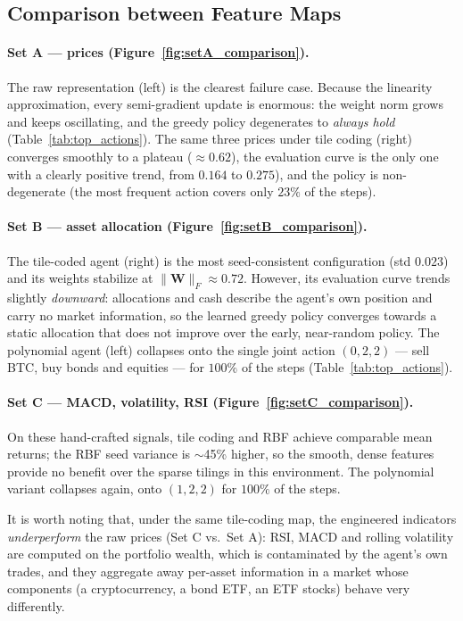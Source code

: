 \documentclass[pdflatex,sn-mathphys-num]{sn-jnl}
\begin{document}
\subsection{Comparison between Feature Maps}

\paragraph{Set A --- prices (Figure~\ref{fig:setA_comparison}).}
The raw representation (left) is the clearest failure case. 
Because the linearity approximation, every semi-gradient update is enormous: 
the weight norm grows and keeps oscillating, and the greedy policy degenerates to \emph{always hold} (Table~\ref{tab:top_actions}). 
The same three prices under tile coding (right) converges smoothly to a plateau ($\approx 0.62$), 
the evaluation curve is the only one with a clearly positive trend, from $0.164$ to $0.275$), and the policy is non-degenerate (the most frequent action covers only $23\%$ of the steps). 

\paragraph{Set B --- asset allocation (Figure~\ref{fig:setB_comparison}).}
The tile-coded agent (right) is the most seed-consistent configuration (std $0.023$) and its weights stabilize at $\|\mathbf{W}\|_F \approx 0.72$. 
However, its evaluation curve trends slightly \emph{downward}: allocations and cash describe the agent's 
own position and carry no market information, so the learned greedy policy converges towards a static allocation that does not improve over the early, 
near-random policy. 
The polynomial agent (left) collapses onto the single joint action $(0,2,2)$ --- sell BTC, buy bonds and equities --- for $100\%$ of the steps (Table~\ref{tab:top_actions}).

\paragraph{Set C --- MACD, volatility, RSI (Figure~\ref{fig:setC_comparison}).}
On these hand-crafted signals, tile coding and RBF achieve comparable mean returns; 
the RBF seed variance is $\sim$45\% higher, so the smooth, 
dense features provide no benefit over the sparse tilings in this environment. 
The polynomial variant collapses again, onto $(1,2,2)$ for $100\%$ of the steps. 

It is worth noting that, under the same tile-coding map, the engineered indicators \emph{underperform} the raw prices (Set C vs.\ Set A): RSI, MACD and rolling volatility are computed on the portfolio wealth, which is contaminated by the agent's own trades, and they aggregate away per-asset information in a market whose components (a cryptocurrency, a bond ETF, an ETF stocks) behave very differently.
\end{document}

